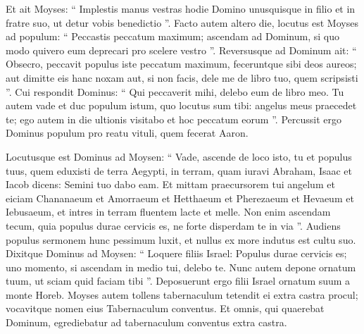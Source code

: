 \begin{biblechapter}
\begin{biblechapter}
\begin{biblechapter}
\begin{biblechapter}
\begin{biblechapter}
\begin{biblechapter}
\begin{biblechapter}
\begin{biblechapter}
\begin{biblechapter}
\begin{biblechapter}
\begin{biblechapter}
\begin{biblechapter}
\begin{biblechapter}
\begin{biblechapter}
\begin{biblechapter}
\begin{biblechapter}
\begin{biblechapter}
\begin{biblechapter}
\begin{biblechapter}
\begin{biblechapter}
\begin{biblechapter}
\begin{biblechapter}
\begin{biblechapter}
\begin{biblechapter}
\begin{biblechapter}
\begin{biblechapter}
\begin{biblechapter}
\begin{biblechapter}
\begin{biblechapter}
\begin{biblechapter}
\begin{biblechapter}
\begin{biblechapter}
\verse Et ait Moyses: “ Implestis manus vestras hodie Domino unusquisque in filio et in fratre suo, ut detur vobis benedictio ”.
 \verse Facto autem altero die, locutus est Moyses ad populum: “ Peccastis peccatum maximum; ascendam ad Dominum, si quo modo quivero eum deprecari pro scelere vestro ”. 
\verse Reversusque ad Dominum ait: “ Obsecro, peccavit populus iste peccatum maximum, feceruntque sibi deos aureos; aut dimitte eis hanc noxam 
 \verse aut, si non facis, dele me de libro tuo, quem scripsisti ”. 
\verse Cui respondit Dominus: “ Qui peccaverit mihi, delebo eum de libro meo. 
\verse Tu autem vade et duc populum istum, quo locutus sum tibi: angelus meus praecedet te; ego autem in die ultionis visitabo et hoc peccatum eorum ”.
 \verse Percussit ergo Dominus populum pro reatu vituli, quem fecerat Aaron.
 
\begin{biblechapter}
\verse Locutusque est Dominus ad Moysen: “ Vade, ascende de loco isto, tu et populus tuus, quem eduxisti de terra Aegypti, in terram, quam iuravi Abraham, Isaac et Iacob dicens: Semini tuo dabo eam. 
\verse Et mittam praecursorem tui angelum et eiciam Chananaeum et Amorraeum et Hetthaeum et Pherezaeum et Hevaeum et Iebusaeum, 
\verse et intres in terram fluentem lacte et melle. Non enim ascendam tecum, quia populus durae cervicis es, ne forte disperdam te in via ”. 
 \verse Audiens populus sermonem hunc pessimum luxit, et nullus ex more indutus est cultu suo.
 \verse Dixitque Dominus ad Moysen: “ Loquere filiis Israel: Populus durae cervicis es; uno momento, si ascendam in medio tui, delebo te. Nunc autem depone ornatum tuum, ut sciam quid faciam tibi ”. 
\verse Deposuerunt ergo filii Israel ornatum suum a monte Horeb.
 \verse Moyses autem tollens tabernaculum tetendit ei extra castra procul; vocavitque nomen eius Tabernaculum conventus. Et omnis, qui quaerebat Dominum, egrediebatur ad tabernaculum conventus extra castra. 

\end{biblechapter}
\end{biblechapter}
\end{biblechapter}
\end{biblechapter}
\end{biblechapter}
\end{biblechapter}
\end{biblechapter}
\end{biblechapter}
\end{biblechapter}
\end{biblechapter}
\end{biblechapter}
\end{biblechapter}
\end{biblechapter}
\end{biblechapter}
\end{biblechapter}
\end{biblechapter}
\end{biblechapter}
\end{biblechapter}
\end{biblechapter}
\end{biblechapter}
\end{biblechapter}
\end{biblechapter}
\end{biblechapter}
\end{biblechapter}
\end{biblechapter}
\end{biblechapter}
\end{biblechapter}
\end{biblechapter}
\end{biblechapter}
\end{biblechapter}
\end{biblechapter}
\end{biblechapter}
\end{biblechapter}
